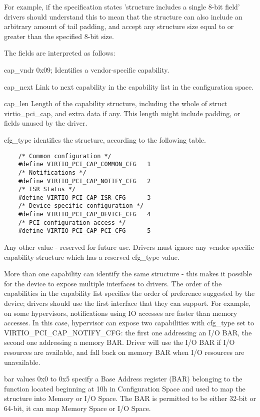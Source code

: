 For example, if the specification states 'structure includes a
single 8-bit field' drivers should understand this to mean that
the structure can also include an arbitrary amount of tail padding,
and accept any structure size equal to or greater than the
specified 8-bit size.

The fields are interpreted as follows:

cap_vndr
        0x09; Identifies a vendor-specific capability.

cap_next
        Link to next capability in the capability list in the configuration space.

cap_len
        Length of the capability structure, including the whole of
        struct virtio_pci_cap, and extra data if any.
        This length might include padding, or fields unused by the driver.

cfg_type
        identifies the structure, according to the following table.

\begin{lstlisting}
	/* Common configuration */
	#define VIRTIO_PCI_CAP_COMMON_CFG	1
	/* Notifications */
	#define VIRTIO_PCI_CAP_NOTIFY_CFG	2
	/* ISR Status */
	#define VIRTIO_PCI_CAP_ISR_CFG		3
	/* Device specific configuration */
	#define VIRTIO_PCI_CAP_DEVICE_CFG	4
	/* PCI configuration access */
	#define VIRTIO_PCI_CAP_PCI_CFG		5
\end{lstlisting}

        Any other value - reserved for future use. Drivers must
        ignore any vendor-specific capability structure which has
        a reserved cfg_type value.

        More than one capability can identify the same structure - this makes it
        possible for the device to expose multiple interfaces to drivers.  The order of
        the capabilities in the capability list specifies the order of preference
        suggested by the device; drivers should use the first interface that they can
        support.  For example, on some hypervisors, notifications using IO accesses are
        faster than memory accesses. In this case, hypervisor can expose two
        capabilities with cfg_type set to VIRTIO_PCI_CAP_NOTIFY_CFG:
        the first one addressing an I/O BAR, the second one addressing a memory BAR.
        Driver will use the I/O BAR if I/O resources are available, and fall back on
        memory BAR when I/O resources are unavailable.

bar
        values 0x0 to 0x5 specify a Base Address register (BAR) belonging to
        the function located beginning at 10h in Configuration Space
        and used to map the structure into Memory or I/O Space.
        The BAR is permitted to be either 32-bit or 64-bit, it can map Memory Space
        or I/O Space.

